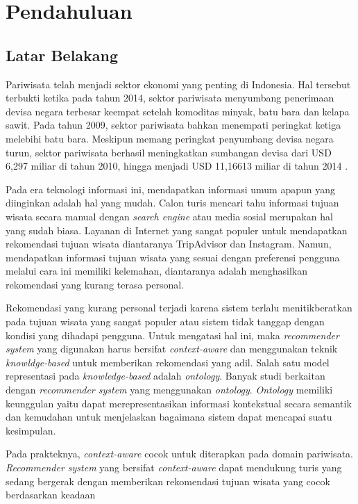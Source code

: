 \chapter{Pendahuluan}
\section{Latar Belakang}

Pariwisata telah menjadi sektor ekonomi yang penting di Indonesia. Hal tersebut terbukti ketika pada tahun 2014, sektor pariwisata menyumbang
penerimaan devisa negara terbesar keempat setelah komoditas minyak, batu bara dan kelapa sawit. Pada tahun 2009, sektor pariwisata bahkan 
menempati peringkat ketiga melebihi batu bara\cite{bps1}. Meskipun memang peringkat penyumbang devisa negara turun, sektor pariwisata 
berhasil meningkatkan sumbangan devisa dari USD 6,297 miliar di tahun 2010, hingga menjadi USD 11,16613 miliar di tahun 2014 \cite{bps2}.
\par
Pada era teknologi informasi ini, mendapatkan informasi umum apapun yang diinginkan adalah hal yang mudah. Calon turis mencari tahu 
informasi tujuan wisata secara manual dengan \textit{search engine} atau media sosial merupakan hal yang sudah biasa. Layanan di Internet 
yang sangat populer untuk mendapatkan rekomendasi tujuan wisata diantaranya TripAdvisor dan Instagram. Namun, mendapatkan informasi tujuan 
wisata yang sesuai dengan preferensi pengguna melalui cara ini memiliki kelemahan, diantaranya adalah menghasilkan rekomendasi yang kurang 
terasa personal.
\par 
Rekomendasi yang kurang personal terjadi karena sistem terlalu menitikberatkan pada tujuan wisata yang sangat populer atau sistem tidak 
tanggap dengan kondisi yang dihadapi pengguna. Untuk mengatasi hal ini, maka \textit{recommender system} yang digunakan harus bersifat 
\textit{context-aware}\cite{alhazbi2013} dan menggunakan teknik \textit{knowldge-based} untuk memberikan rekomendasi yang adil. 
Salah satu model representasi pada \textit{knowledge-based} adalah \textit{ontology}. Banyak studi berkaitan dengan \textit{recommender system}
yang menggunakan \textit{ontology}. \textit{Ontology} memiliki keunggulan yaitu 
dapat merepresentasikan informasi kontekstual secara semantik dan kemudahan untuk menjelaskan bagaimana sistem dapat mencapai suatu 
kesimpulan. 
\par
Pada prakteknya, \textit{context-aware} cocok untuk diterapkan pada domain pariwisata. \textit{Recommender system} yang bersifat 
\textit{context-aware} dapat mendukung turis yang sedang bergerak dengan memberikan rekomendasi tujuan wisata yang cocok berdasarkan keadaan 
